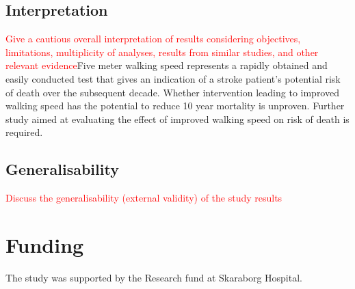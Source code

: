 \documentclass[a4paper,12pt]{article}
\begin{document}
\subsection{Interpretation} \textcolor{red}{Give a cautious overall interpretation of results considering objectives, limitations, multiplicity of analyses, results from similar studies, and other relevant evidence}Five meter walking speed represents a rapidly obtained and easily conducted test that gives an indication of a stroke patient's potential risk of death over the subsequent decade. Whether intervention leading to improved walking speed has the potential to reduce 10 year mortality is unproven. Further study aimed at evaluating the effect of improved walking speed on risk of death is required.
\subsection{Generalisability} \textcolor{red}{Discuss the generalisability (external validity) of the study results}

\section{Funding} The study was supported by the Research fund at Skaraborg Hospital.
\end{document}
